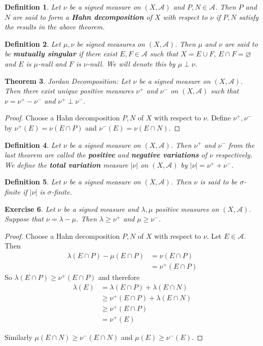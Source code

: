 \documentclass[12pt]{amsart}
\newtheorem{thm}{Theorem}[section]
\newtheorem{defn}[thm]{Definition}
\newtheorem{ex}[thm]{Exercise}
\newcommand{\lam}{\lambda}
\newcommand{\sig}{\sigma}
\newcommand{\MA}{\mathcal{A}}
\begin{document}
\begin{defn}
Let $\nu$ be a signed measure on $(X, \MA)$ and $P,N \in \MA$. Then $P$ and $N$ are said to form a \textbf{Hahn decomposition} of $X$ with respect to $\nu$ if $P,N$ satisfy the results in the above theorem.
\end{defn}

\begin{defn}
Let $\mu, \nu$ be signed measures on $(X, \MA)$. Then $\mu$ and $\nu$ are said to be \textbf{mutually singular} if there exist $E, F \in \MA$ such that $X = E \cup F$, $E \cap F = \varnothing$ and $E$ is $\mu$-null and $F$ is $\nu$-null. We will denote this by $\mu \perp \nu$.
\end{defn}

\begin{thm}{Jordan Decomposition:}
Let $\nu$ be a signed measure on $(X, \MA)$. Then there exist unique positive measures $\nu^+$ and $\nu^-$ on $(X, \MA)$ such that $\nu = \nu^+ - \nu^-$ and $\nu^+ \perp \nu^-$. 
\end{thm}

\begin{proof}
Choose a Hahn decomposition $P,N$ of $X$ with respect to $\nu$. Define $\nu^+, \nu^-$ by $\nu^+(E)= \nu(E \cap P)$ and $\nu^-(E) = \nu(E \cap N)$.
\end{proof}

\begin{defn}
Let $\nu$ be a signed measure on $(X, \MA)$. Then $\nu^+$ and $\nu^-$ from the last theorem are called the \textbf{positive} and \textbf{negative variations} of $\nu$ respectively. We define the \textbf{total variation} measure $|\nu|$ on $(X, \MA)$ by $|\nu| = \nu^+ + \nu^-$. 
\end{defn}

\begin{defn}
Let $\nu$ be a signed measure on $(X,\MA)$. Then $\nu$ is said to be $\sig$-finite if $|\nu|$ is $\sig$-finite.
\end{defn}

\begin{ex}
Let $\nu$ be a signed measure and $\lam, \mu$ positive measures on $(X,\MA)$. Suppose that $\nu = \lam - \mu$. Then $\lam \geq \nu^+$ and $\mu \geq \nu^-$.
\end{ex}

\begin{proof}
Choose a Hahn decomposition $P,N$ of $X$ with respect to $\nu$. Let $E \in \MA$. Then 
\begin{align*}
\lam(E \cap P) - \mu(E \cap P) 
&= \nu(E \cap P)\\
&= \nu^+(E \cap P)
\end{align*}
So $\lam(E \cap P) \geq  \nu^+(E \cap P) $ and therefore 
\begin{align*}
\lam(E) 
&= \lam(E \cap P) + \lam(E \cap N)\\
& \geq \nu^+(E \cap P) + \lam (E \cap N)\\
& \geq \nu^+(E \cap P)\\
& = \nu^+(E)
\end{align*} 

Similarly $\mu(E \cap N) \geq \nu^-(E \cap N)$ and $\mu(E) \geq \nu^-(E)$.
\end{proof}
\end{document}
